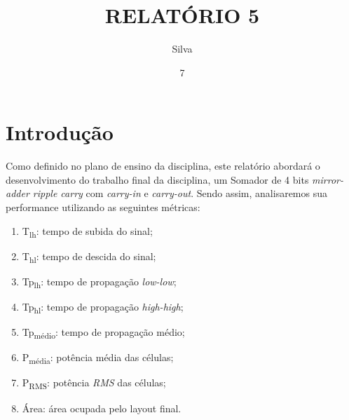 \documentclass{iiufrgs}
\title{RELATÓRIO 5}
\author{Silva}{Henrique Corrêa Pereira da}
\date{7}{2018}
\begin{document}
\maketitle


\tableofcontents






%

\chapter{Introdução}\label{intro}

Como definido no plano de ensino da disciplina, este relatório abordará o desenvolvimento do trabalho final da disciplina, um Somador de 4 bits \textit{mirror-adder ripple carry} com \textit{carry-in} e \textit{carry-out}. Sendo assim, analisaremos sua performance utilizando as seguintes métricas:

\begin{enumerate}[leftmargin=3em, noitemsep] %
    \setlength{\itemindent}{1em}
    \item T\textsubscript{lh}: tempo de subida do sinal;
    \item T\textsubscript{hl}: tempo de descida do sinal;
    \item Tp\textsubscript{lh}: tempo de propagação \textit{low-low}; 
    \item Tp\textsubscript{hl}: tempo de propagação \textit{high-high}; 
    \item Tp\textsubscript{médio}: tempo de propagação médio; 
    \item P\textsubscript{média}: potência média das células; 
    \item P\textsubscript{RMS}: potência \textit{RMS} das células;
    \item Área: área ocupada pelo layout final.
\end{enumerate}
\end{document}
